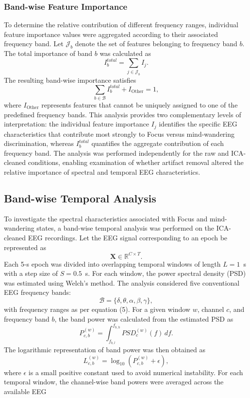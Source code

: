 \documentclass[conference]{IEEEtran}
\begin{document}
\subsubsection{Band-wise Feature Importance} To determine the relative contribution of different frequency ranges, individual feature importance values were aggregated according to their associated frequency band. Let $\mathcal{J}_b$ denote the set of features belonging to frequency band $b$. The total importance of band $b$ was calculated as \begin{equation} I_b^{total} = \sum_{j\in\mathcal{J}_b} I_j. \end{equation} The resulting band-wise importance satisfies \begin{equation} \sum_{b\in\mathcal{B}} I_b^{total} +I_{\mathrm{Other}} =1, \end{equation} where $I_{\mathrm{Other}}$ represents features that cannot be uniquely assigned to one of the predefined frequency bands. This analysis provides two complementary levels of interpretation: the individual feature importance $I_j$ identifies the specific EEG characteristics that contribute most strongly to Focus versus mind-wandering discrimination, whereas $I_b^{total}$ quantifies the aggregate contribution of each frequency band. The analysis was performed independently for the raw and ICA-cleaned conditions, enabling examination of whether artifact removal altered the relative importance of spectral and temporal EEG characteristics. \subsection{Band-wise Temporal Analysis} To investigate the spectral characteristics associated with Focus and mind-wandering states, a band-wise temporal analysis was performed on the ICA-cleaned EEG recordings. Let the EEG signal corresponding to an epoch be represented as \begin{equation} \mathbf{X}\in\mathbb{R}^{C\times T}. \end{equation} Each 5-s epoch was divided into overlapping temporal windows of length $L=1$~s with a step size of $S=0.5$~s. For each window, the power spectral density (PSD) was estimated using Welch's method. The analysis considered five conventional EEG frequency bands: \begin{equation} \mathcal{B}= \{\delta,\theta,\alpha,\beta,\gamma\}, \end{equation} with frequency ranges as per equation (5). For a given window $w$, channel $c$, and frequency band $b$, the band power was calculated from the estimated PSD as \begin{equation} P_{c,b}^{(w)} = \int_{f_{b,l}}^{f_{b,h}} PSD_c^{(w)}(f)\,df. \end{equation} The logarithmic representation of band power was then obtained as \begin{equation} L_{c,b}^{(w)} = \log_{10}\left(P_{c,b}^{(w)}+\epsilon\right), \end{equation} where $\epsilon$ is a small positive constant used to avoid numerical instability. For each temporal window, the channel-wise band powers were averaged across the available EEG 
\end{document}

